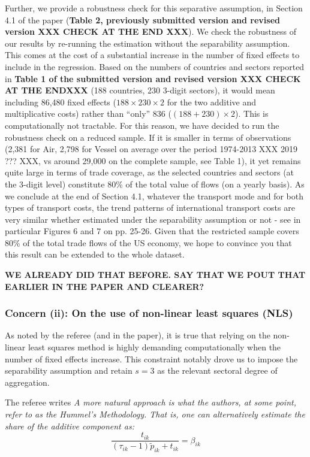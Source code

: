 \documentclass[a4paper,11pt]{article}
\begin{document}
Further, we provide a robustness check for this separative assumption, in Section 4.1 of the paper (\textbf{Table 2, previously submitted version and revised version XXX CHECK AT THE END XXX}). We check the robustness of our results by re-running the estimation without the separability assumption. This comes at the cost of a substantial increase in the number of fixed effects to include in the regression. Based on the numbers of countries and sectors reported in \textbf{Table 1 of the submitted version and revised version  XXX CHECK AT THE ENDXXX} (188 countries, 230 3-digit sectors), it would mean including 86,480 fixed effects ($188\times230\times2$ for the two additive and multiplicative costs) rather than ``only'' 836 ($(188+230)\times 2$). This is computationally not tractable. For this reason, we have decided to run the robustness check on a reduced sample. If it is smaller in terms of observations (2,381 for Air, 2,798 for Vessel on average over the period 1974-2013 XXX 2019 ??? XXX, vs around 29,000 on the complete sample, see Table 1), it yet remains quite large in terms of trade coverage, as the selected countries and sectors (at the 3-digit level) constitute 80\% of the total value of flows (on a yearly basis). As we conclude at the end of Section 4.1, whatever the transport mode and for both types of transport costs, the trend patterns of international transport costs are very similar whether estimated under the separability assumption or not - see in particular Figures 6 and 7 on pp. 25-26. Given that the restricted sample covers 80\% of the total trade flows of the US economy, we hope to convince you that this result can be extended to the whole dataset.

\textbf{WE ALREADY DID THAT BEFORE. SAY THAT WE POUT THAT EARLIER IN THE PAPER AND CLEARER?} 


\subsubsection{Concern (ii): On the use of non-linear least squares (NLS)} As noted by the referee (and in the paper), it is true that relying on the non-linear least squares method is highly demanding computationally when the number of fixed effects increase. This constraint notably drove us to impose the separability assumption and retain $s=3$ as the relevant sectoral degree of aggregation.


The referee writes \textit{A more natural approach is what the authors, at some point, refer to as the Hummel's Methodology. That is, one can alternatively estimate the share of the additive component as:}
$$\frac{t_{ik}}{ (\tau_{ik}-1)\tilde{p}_{ik} + t_{ik}} = \beta_{ik}$$
\end{document}
